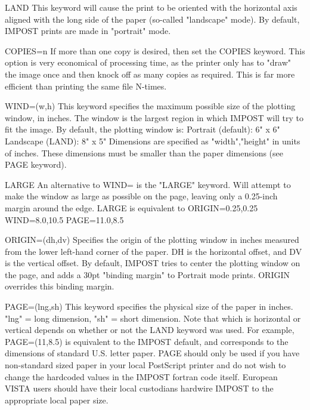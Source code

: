 \begin{example}
  \item[LAND]{This keyword will cause the print to be oriented with the
         horizontal axis aligned with the long side of the paper 
         (so-called "landscape" mode).  By default, IMPOST prints are 
         made in "portrait" mode.}
  \item[COPIES=n]{If more than one copy is desired, then set the COPIES keyword.
         This option is very economical of processing time, as the
         printer only has to "draw" the image once and then knock off
         as many copies as required.  This is far more efficient than 
         printing the same file N-times.}
  \item[WIND=(w,h)]{This keyword specifies the maximum possible size of the
         plotting window, in inches.  The window is the largest
         region in which IMPOST will try to fit the image.
         By default, the plotting window is:
             Portrait (default):  6" x 6"
               Landscape (LAND):  8" x 5"
         Dimensions are specified as "width","height" in units of inches.
         These dimensions must be smaller than the paper dimensions 
         (see PAGE keyword).}
  \item[LARGE]{An alternative to WIND= is the "LARGE" keyword.  Will attempt
         to make the window as large as possible on the page, leaving only
         a 0.25-inch margin around the edge.  LARGE is equivalent to
            ORIGIN=0.25,0.25  WIND=8.0,10.5  PAGE=11.0,8.5}
  \item[ORIGIN=(dh,dv)]{Specifies the origin of the plotting window
         in inches measured from the lower left-hand corner of the 
         paper.  DH is the horizontal offset, and DV is the vertical
         offset.  By default, IMPOST tries to center the plotting 
         window on the page, and adds a 30pt "binding margin" to 
         Portrait mode prints.  ORIGIN overrides this binding margin.}
  \item[PAGE=(lng,sh)]{This keyword specifies the physical size of the paper in
         inches.  "lng" = long dimension, "sh" = short dimension.
         Note that which is horizontal or vertical depends on
         whether or not the LAND keyword was used.  For example, 
         PAGE=(11,8.5) is equivalent to the IMPOST default, and
         corresponds to the dimensions of standard U.S. letter
         paper.  PAGE should only be used if you have non-standard 
         sized paper in your local PostScript printer and do not
         wish to change the hardcoded values in the IMPOST fortran
         code itself.  European VISTA users should have their
         local custodians hardwire IMPOST to the appropriate local
         paper size.}
\end{example}

